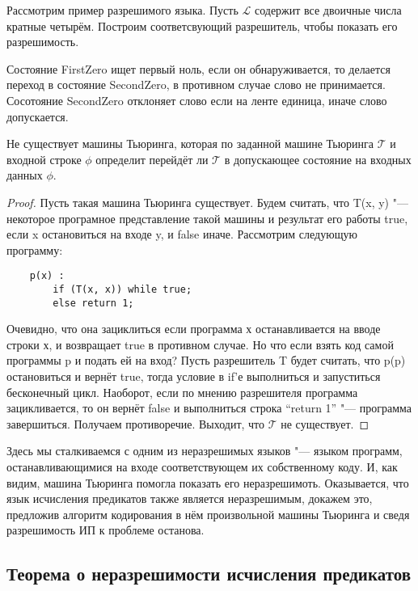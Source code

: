 Рассмотрим пример разрешимого языка. Пусть $\mathcal{L}$ содержит все двоичные числа кратные четырём.
Построим соответсвующий разрешитель, чтобы показать его разрешимость.

Состояние FirstZero ищет первый ноль, если он обнаруживается, то делается переход в состояние SecondZero,
в противном случае слово не принимается. Сосотояние SecondZero отклоняет слово если на ленте единица,
иначе слово допускается. 

\begin{theorem} Не существует машины Тьюринга, которая по заданной машине Тьюринга $\mathcal{T}$ и
входной строке $\phi$ определит перейдёт ли $\mathcal{T}$ в допускающее состояние на входных данных
$\phi$.
\end{theorem}

\begin{proof} 
Пусть такая машина Тьюринга существует. Будем считать, что T(x, y) "--- некоторое програмное
представление такой машины и результат его работы true, если x остановиться на входе y, и false иначе.
Рассмотрим следующую программу:

\begin{verbatim}
    p(x) : 
        if (T(x, x)) while true;
        else return 1;
\end{verbatim}

Очевидно, что она зациклиться если программа х останавливается на вводе строки х, и возвращает true в
противном случае. Но что если взять код самой программы p и подать ей на вход? Пусть разрешитель T будет
считать, что p(p) остановиться и вернёт true, тогда условие в if'е выполниться и запуститься бесконечный
цикл. Наоборот, если по мнению разрешителя программа зацикливается, то он вернёт false и выполниться
строка ``return 1'' "--- программа завершиться. Получаем противоречие. Выходит, что $\mathcal{T}$ не
существует.
\end{proof}

Здесь мы сталкиваемся с одним из неразрешимых языков "--- языком программ, останавливающимися на входе
соответствующем их собственному коду. И, как видим, машина Тьюринга помогла показать его неразрешимоть.
Оказывается, что язык исчисления предикатов также является неразрешимым, докажем это, предложив алгоритм
кодирования в нём произвольной машины Тьюринга и сведя разрешимость ИП к проблеме останова.

\subsection{Теорема о неразрешимости исчисления предикатов}

